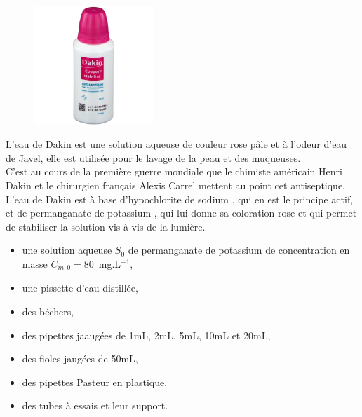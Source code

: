\begin{tcolorbox}[colback=orange!5!white,colframe=orange!75!black,title= Scénario:]
\begin{figure}
\vspace{-0.6cm}
    \centering
      \includegraphics[width=0.4\textwidth]{Images/Dakin.jpg}
  \end{figure}
L’eau de Dakin est une solution aqueuse de couleur rose pâle et à l’odeur d’eau de Javel, elle est utilisée pour le lavage de la peau et des muqueuses.\\
C’est au cours de la première guerre mondiale que le chimiste américain Henri Dakin et le chirurgien français Alexis Carrel mettent au point cet antiseptique.\\
L’eau de Dakin est à base d’hypochlorite de sodium , qui en est le principe actif, et de permanganate de potassium , qui lui donne sa coloration rose et qui permet de stabiliser la solution vis-à-vis de la lumière.\\

\end{tcolorbox}
\newpage

\begin{mdframed}[style=autreexo]
\textbf{}
\begin{itemize}
    \item une solution aqueuse $S_0$ de permanganate de potassium  de concentration en masse $C_{m,0}=80$~mg.L$^{-1}$, 
    \item une pissette d'eau distillée,
    \item des béchers,
    \item des pipettes jaaugées de 1mL, 2mL, 5mL, 10mL et 20mL,
    \item des fioles jaugées de 50mL,
    \item des pipettes Pasteur en plastique,
    \item des tubes à essais et leur support.    
\end{itemize}
\end{mdframed}


